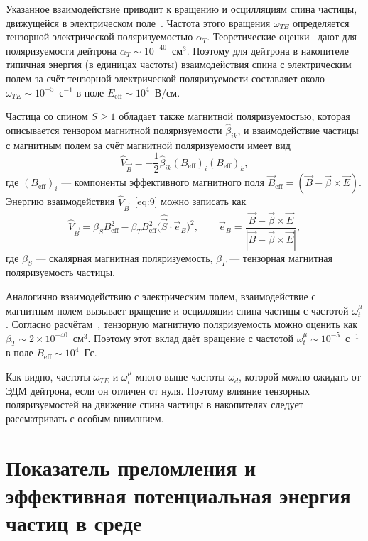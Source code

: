 \documentclass[11pt,a4paper]{article}
\newcommand{\hvec}[1]{\hat{\vec{#1}}}
\begin{document}
Указанное взаимодействие приводит к вращению и осцилляциям спина частицы,
движущейся в электрическом поле~\cite{BarySTORI05,BaryShirvel05,Bary0504064,BaryGurin05}.
Частота этого вращения $\omega_{TE}$ определяется тензорной электрической
поляризуемостью $\alpha_T$. Теоретические оценки~\cite{Chen98} дают
для поляризуемости дейтрона $\alpha_T\sim 10^{-40}$~см$^3$. Поэтому
для дейтрона в накопителе типичная энергия (в единицах частоты)
взаимодействия спина с электрическим полем за счёт тензорной электрической
поляризуемости составляет около $\omega_{TE}\sim 10^{-5}$~с$^{-1}$
в поле $E_{\mathrm{eff}}\sim 10^{4}$~В/см.

Частица со спином $S\geqslant 1$ обладает также магнитной поляризуемостью,
которая описывается тензором магнитной поляризуемости $\hat{\beta}_{ik}$,
и взаимодействие частицы с магнитным полем за счёт магнитной
поляризуемости имеет вид
\begin{equation}
\hat{V}_{\vec{B}}=-\frac12\hat{\beta}_{ik}(B_{\mathrm{eff}})_i(B_{\mathrm{eff}})_k,
\label{eq:9}
\end{equation}
где $(B_{\mathrm{eff}})_i$ --- компоненты эффективного магнитного поля
$\vec{B}_{\mathrm{eff}}=(\vec{B}-\vec{\beta}\times\vec{E})$. Энергию
взаимодействия $\hat{V}_{\vec{B}}$~\eqref{eq:9} можно записать как
\begin{equation}
\hat{V}_{\vec{B}}
=\beta_S B_{\mathrm{eff}}^2
-\beta_T B_{\mathrm{eff}}^2\bigl(\hvec{S}\cdot\vec{e}_B\bigr)^2,\qquad
\vec{e}_B=\frac{\vec{B}-\vec{\beta}\times\vec{E}}{|\vec{B}-\vec{\beta}\times\vec{E}|},
\label{eq:10}
\end{equation}
где $\beta_S$ --- скалярная магнитная поляризуемость, $\beta_T$ ---
тензорная магнитная поляризуемость частицы.

Аналогично взаимодействию с электрическим полем, взаимодействие
с магнитным полем вызывает вращение и осцилляции спина частицы
с частотой $\omega_t^{\mu}$. Согласно расчётам~\cite{Chen98},
тензорную магнитную поляризуемость можно оценить как
$\beta_T\sim 2\times 10^{-40}$~см$^3$. Поэтому этот вклад даёт вращение
с частотой $\omega_t^{\mu}\sim 10^{-5}$~с$^{-1}$ в поле
$B_{\mathrm{eff}}\sim 10^{4}$~Гс.

Как видно, частоты $\omega_{TE}$ и $\omega_t^{\mu}$ много выше частоты
$\omega_d$, которой можно ожидать от ЭДМ дейтрона, если он отличен
от нуля. Поэтому влияние тензорных поляризуемостей на движение спина
частицы в накопителях следует рассматривать с особым вниманием.

\section{Показатель преломления и эффективная потенциальная энергия
частиц в среде}
\end{document}
